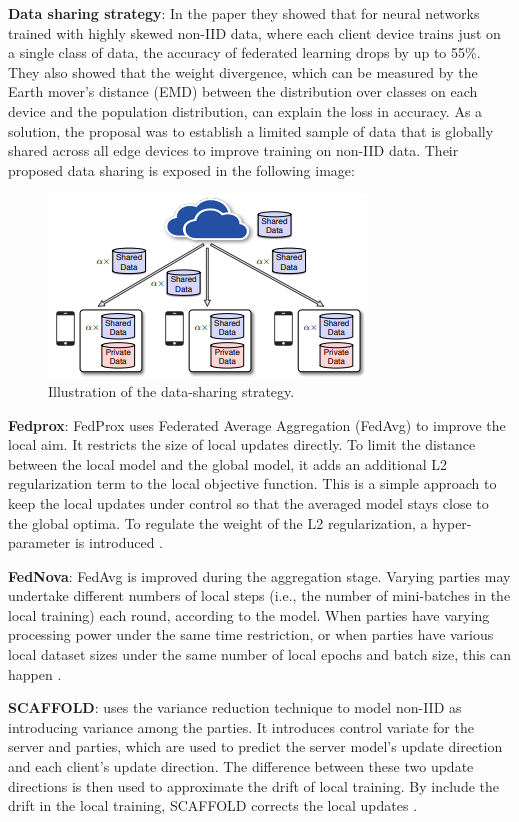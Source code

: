 \textbf{Data sharing strategy}: In the paper \cite{fl18} they showed that for neural networks trained with highly skewed non-IID data, where each client device trains just on a single class of data, the accuracy of federated learning drops by up to 55\%. They also showed that the weight divergence, which can be measured by the Earth mover's distance (EMD) between the distribution over classes on each device and the population distribution, can explain the loss in accuracy. As a solution, the proposal was to establish a limited sample of data that is globally shared across all edge devices to improve training on non-IID data. Their proposed data sharing is exposed in the following image:

\begin{figure}[H]
\centering
\includegraphics[scale=0.9]{img/fl18_datasharing.PNG}
\caption{ Illustration of the data-sharing strategy. \cite{fl18}}
\label{fig:fl18_datasharing}
\end{figure}

\textbf{Fedprox}: FedProx uses Federated Average Aggregation (FedAvg) to improve the local aim. It restricts the size of local updates directly. To limit the distance between the local model and the global model, it adds an additional L2 regularization term to the local objective function. This is a simple approach to keep the local updates under control so that the averaged model stays close to the global optima. To regulate the weight of the L2 regularization, a hyper-parameter is introduced \cite{fl19}.

\textbf{FedNova}: FedAvg is improved during the aggregation stage. Varying parties may undertake different numbers of local steps (i.e., the number of mini-batches in the local training) each round, according to the model. When parties have varying processing power under the same time restriction, or when parties have various local dataset sizes under the same number of local epochs and batch size, this can happen \cite{fl19}.

\textbf{SCAFFOLD}: uses the variance reduction technique to model non-IID as introducing variance among the parties. It introduces control variate for the server and parties, which are used to predict the server model's update direction and each client's update direction. The difference between these two update directions is then used to approximate the drift of local training. By include the drift in the local training, SCAFFOLD corrects the local updates \cite{fl19}.

